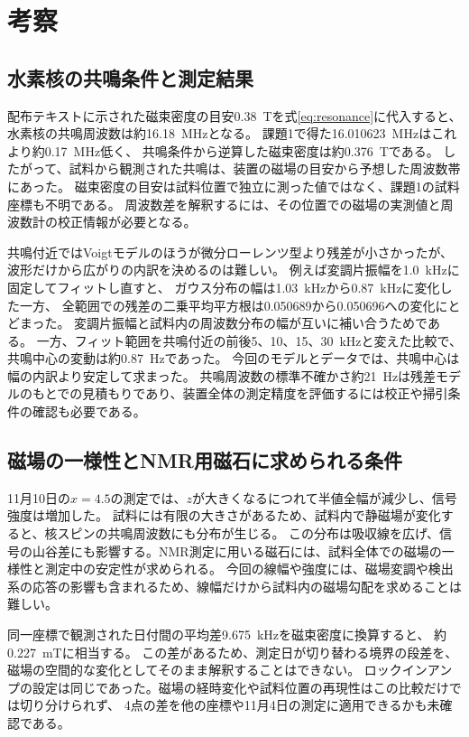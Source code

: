 \documentclass[dvipdfmx,a4paper,11pt]{jsarticle}
\begin{document}
\section{考察}
\label{sec:discussion}

\subsection{水素核の共鳴条件と測定結果}
配布テキストに示された磁束密度の目安\SI{0.38}{\tesla}を式\eqref{eq:resonance}に代入すると、
水素核の共鳴周波数は約\SI{16.18}{\mega\hertz}となる。
課題1で得た\SI{16.010623}{\mega\hertz}はこれより約\SI{0.17}{\mega\hertz}低く、
共鳴条件から逆算した磁束密度は約\SI{0.376}{\tesla}である。
したがって、試料から観測された共鳴は、装置の磁場の目安から予想した周波数帯にあった。
磁束密度の目安は試料位置で独立に測った値ではなく、課題1の試料座標も不明である。
周波数差を解釈するには、その位置での磁場の実測値と周波数計の校正情報が必要となる。

共鳴付近ではVoigtモデルのほうが微分ローレンツ型より残差が小さかったが、波形だけから広がりの内訳を決めるのは難しい。
例えば変調片振幅を\SI{1.0}{\kilo\hertz}に固定してフィットし直すと、
ガウス分布の幅は\SI{1.03}{\kilo\hertz}から\SI{0.87}{\kilo\hertz}に変化した一方、
全範囲での残差の二乗平均平方根は0.050689から0.050696への変化にとどまった。
変調片振幅と試料内の周波数分布の幅が互いに補い合うためである。
一方、フィット範囲を共鳴付近の前後5、10、15、\SI{30}{\kilo\hertz}と変えた比較で、共鳴中心の変動は約\SI{0.87}{\hertz}であった。
今回のモデルとデータでは、共鳴中心は幅の内訳より安定して求まった。
共鳴周波数の標準不確かさ約\SI{21}{\hertz}は残差モデルのもとでの見積もりであり、装置全体の測定精度を評価するには校正や掃引条件の確認も必要である。

\subsection{磁場の一様性とNMR用磁石に求められる条件}
11月10日の$x=4.5$の測定では、$z$が大きくなるにつれて半値全幅が減少し、信号強度は増加した。
試料には有限の大きさがあるため、試料内で静磁場が変化すると、核スピンの共鳴周波数にも分布が生じる。
この分布は吸収線を広げ、信号の山谷差にも影響する。NMR測定に用いる磁石には、試料全体での磁場の一様性と測定中の安定性が求められる。
今回の線幅や強度には、磁場変調や検出系の応答の影響も含まれるため、線幅だけから試料内の磁場勾配を求めることは難しい。

同一座標で観測された日付間の平均差\SI{9.675}{\kilo\hertz}を磁束密度に換算すると、
約\SI{0.227}{\milli\tesla}に相当する。
この差があるため、測定日が切り替わる境界の段差を、磁場の空間的な変化としてそのまま解釈することはできない。
ロックインアンプの設定は同じであった。磁場の経時変化や試料位置の再現性はこの比較だけでは切り分けられず、
4点の差を他の座標や11月4日の測定に適用できるかも未確認である。
\end{document}
